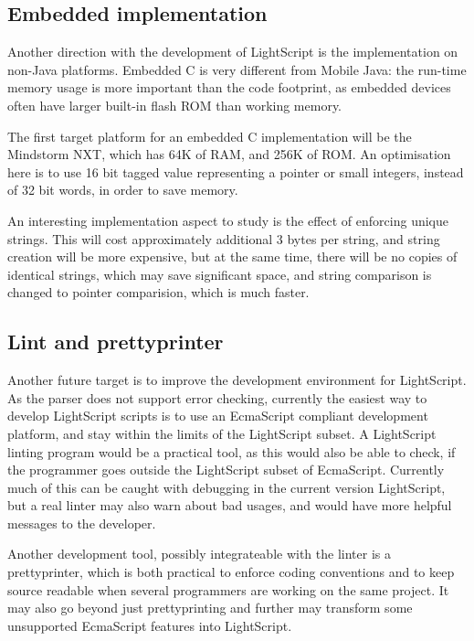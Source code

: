\documentclass[11pt]{report}
\begin{document}
\subsection{Embedded implementation}

Another direction with the development of LightScript is the implementation on non-Java platforms.
Embedded C is very different from Mobile Java: the run-time memory usage is more important than the code footprint, as embedded devices often have larger built-in flash ROM than working memory.

The first target platform for an embedded C implementation will be the Mindstorm NXT, which has 64K of RAM, and 256K of ROM.
An optimisation here is to use 16 bit tagged value representing a pointer or small integers, instead of 32 bit words, in order to save memory. 

An interesting implementation aspect to study is the effect of enforcing unique strings. This will cost approximately additional 3 bytes per string, and string creation will be more expensive, but at the same time, there will be no copies of identical strings, which may save significant space, and string comparison is changed to pointer comparision, which is much faster.

\subsection{Lint and prettyprinter}

Another future target is to improve the development environment for LightScript.
As the parser does not support error checking, currently the easiest way to develop LightScript scripts is to use an EcmaScript compliant development platform, and stay within the limits of the LightScript subset.
A LightScript linting program would be a practical tool, as this would also be able to check, if the programmer goes outside the LightScript subset of EcmaScript.
Currently much of this can be caught with debugging in the current version LightScript, but a real linter may also warn about bad usages, and would have more helpful messages to the developer.

Another development tool, possibly integrateable with the linter is a prettyprinter, which is both practical to enforce coding conventions and to keep source readable when several programmers are working on the same project. It may also go beyond just prettyprinting and further may transform some unsupported EcmaScript features into LightScript.
\end{document}
